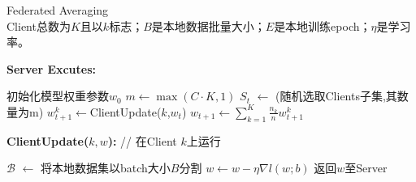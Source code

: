 \renewcommand{\algorithmiccomment}[1]{// #1}
\begin{algorithm}
\caption{Federated Averaging\\
Client总数为$K$且以$k$标志；$B$是本地数据批量大小；$E$是本地训练epoch；$\eta$是学习率。}
\label{FedAvg}
{\bfseries Server Excutes:}
\begin{algorithmic}
\STATE 初始化模型权重参数$w_0$
\STATE $m \leftarrow \max(C\cdot K,1)$
\STATE $S_t$ $\leftarrow$ (随机选取Clients子集,其数量为m)
\STATE $w_{t+1}^{k}\leftarrow$ClientUpdate($k$,$w_t$) 
\ENDFOR
\STATE $w_{t+1}\leftarrow\sum_{k=1}^{K}\frac{n_k}{n}w_{t+1}^k$
\ENDFOR
\end{algorithmic}

{\bfseries ClientUpdate($k,w$):} // 在Client $k$上运行
\begin{algorithmic}
\STATE $\mathcal{B}$ $\leftarrow$ 将本地数据集以batch大小$B$分割
\STATE $w\leftarrow w-\eta\nabla{l(w;b)}$
\ENDFOR
\ENDFOR
\STATE 返回$w$至Server
\end{algorithmic}
\end{algorithm}
